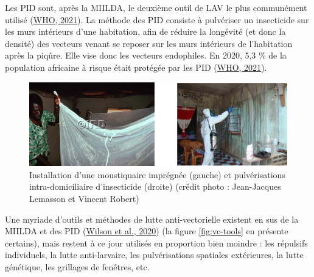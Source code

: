 \documentclass[12pt,twoside]{reedthesis}
\begin{document}
Les PID sont, après la MIILDA, le deuxième outil de LAV le plus communément utilisé (\protect\hyperlink{ref-who_2021}{WHO, 2021}). La méthode des PID consiste à pulvériser un insecticide sur les murs intérieurs d'une habitation, afin de réduire la longévité (et donc la densité) des vecteurs venant se reposer sur les murs intérieurs de l'habitation après la piqûre. Elle vise donc les vecteurs endophiles. En 2020, 5,3 \% de la population africaine à risque était protégée par les PID (\protect\hyperlink{ref-who_2021}{WHO, 2021}).\\
\begin{figure}

{\centering \includegraphics[width=1\linewidth]{figure/milda_pid} 

}

\caption[Installation d'une moustiquaire imprégnée et pulvérisations intra-domiciliaire d'insecticide]{Installation d'une moustiquaire imprégnée (gauche) et pulvérisations intra-domiciliaire d'insecticide (droite) (crédit photo : Jean-Jacques Lemasson et Vincent Robert)}\label{fig:milda-pid}
\end{figure}
Une myriade d'outils et méthodes de lutte anti-vectorielle existent en sus de la MIILDA et des PID (\protect\hyperlink{ref-wilson_importance_2020}{Wilson et al., 2020}) (la figure \ref{fig:vc-tools} en présente certains), mais restent à ce jour utilisés en proportion bien moindre : les répulsifs individuels, la lutte anti-larvaire, les pulvérisations spatiales extérieures, la lutte génétique, les grillages de fenêtres, etc.
\end{document}
